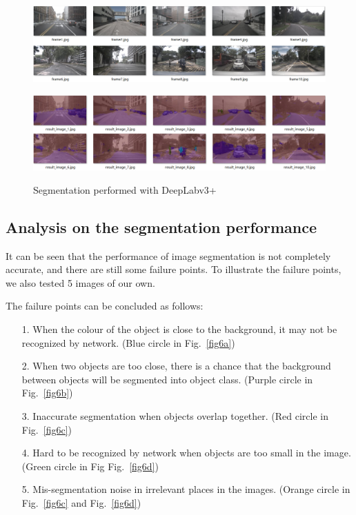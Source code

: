 \documentclass[10pt]{article}
\theoremstyle{nonumberplain}
\begin{document}
\begin{figure}[H]
	\centering
	\begin{minipage}[t]{1\textwidth}
		\centering
		\includegraphics[width=15cm]{211.png}
		\label{fig5a}
	\end{minipage}
	\begin{minipage}[t]{1\textwidth}
		\centering
		\includegraphics[width=15cm]{2.1_2.png}
		\label{fig5b}
	\end{minipage}
	\caption{Segmentation performed with DeepLabv3+}
	\label{fig5}
\end{figure} 


\subsection{Analysis on the segmentation performance}

\hspace{1.0em}
It can be seen that the performance of image segmentation is not completely accurate, and there are still some failure points. To illustrate the failure points, we also tested 5 images of our own.

The failure points can be concluded as follows:

\begin{itemize}[itemsep=2pt,topsep=0pt,parsep=0pt]
	\item[1.] When the colour of the object is close to the background, it may not be recognized by network. (Blue circle in Fig.~\ref{fig6a})
	\item[2.] When two objects are too close, there is a chance that the background between objects will be segmented into object class. (Purple circle in Fig.~\ref{fig6b})
	\item[3.] Inaccurate segmentation when objects overlap together. (Red circle in Fig.~\ref{fig6c})
	\item[4.] Hard to be recognized by network when objects are too small in the image. (Green circle in Fig Fig.~\ref{fig6d})
	\item[5.] Mis-segmentation noise in irrelevant places in the images. (Orange circle in Fig.~\ref{fig6c} and Fig.~\ref{fig6d})
\end{itemize}
\end{document}
